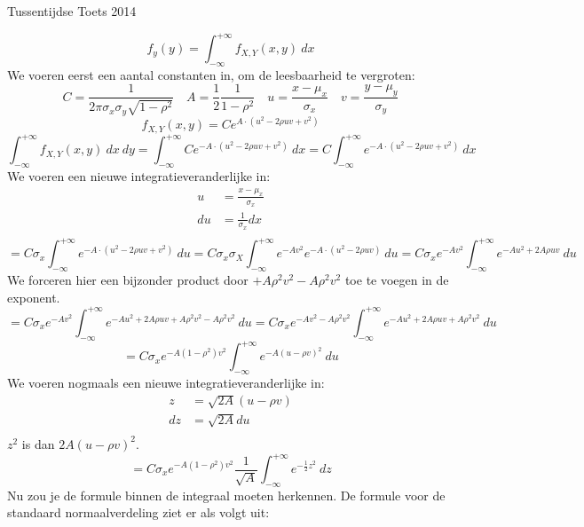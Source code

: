 \documentclass[main.tex]{subfiles}
\begin{document}
\begin{examenvraag}{Tussentijdse Toets 2014}
  \begin{ex-antwoord}
    \[ f_{y}(y) = \int_{-\infty}^{+\infty}f_{X,Y}(x,y)\ dx \]
    We voeren eerst een aantal constanten in, om de leesbaarheid te vergroten:
    \[ 
    C = \dfrac{1}{2\pi\sigma_{x}\sigma_{y}\sqrt{1-\rho^{2}}} \quad A = \frac{1}{2}\frac{1}{1-\rho^{2}} \quad u = \frac{x-\mu_{x}}{\sigma_{x}} \quad v = \frac{y-\mu_{y}}{\sigma_{y}}
    \]
    \[ f_{X,Y}(x,y) = C e^{A \cdot (u^{2}-2\rho u v + v^{2})} \]
    \[ \int_{-\infty}^{+\infty}f_{X,Y}(x,y)\ dx\ dy = \int_{-\infty}^{+\infty} C e^{-A \cdot (u^{2}-2\rho u v + v^{2})}\ dx = C\int_{-\infty}^{+\infty}e^{-A \cdot (u^{2}-2\rho u v + v^{2})}\ dx \]
    We voeren een nieuwe integratieveranderlijke in:
    \[ 
    \begin{array}{rl}
      u &= \frac{x-\mu_{x}}{\sigma_{x}}\\
      du &= \frac{1}{\sigma_{x}}dx\\
    \end{array}
    \]
    \[
    = C\sigma_{x}\int_{-\infty}^{+\infty}e^{-A \cdot (u^{2}-2\rho u v + v^{2})}\ du
    = C\sigma_{x}\sigma_{X}\int_{-\infty}^{+\infty}e^{-Av^{2}}e^{-A \cdot (u^{2}-2\rho u v)}\ du
    = C\sigma_{x}e^{-Av^{2}}\int_{-\infty}^{+\infty}e^{-Au^{2}+2A\rho u v}\ du
    \]
    We forceren hier een bijzonder product door $+ A\rho^{2}v^{2} - A\rho^{2}v^{2}$ toe te voegen in de exponent.
    \[
    = C\sigma_{x}e^{-Av^{2}}\int_{-\infty}^{+\infty}e^{-Au^{2}+2A\rho u v + A\rho^{2}v^{2} - A\rho^{2}v^{2}}\ du 
    = C\sigma_{x}e^{-Av^{2}-A\rho^{2}v^{2}}\int_{-\infty}^{+\infty}e^{-Au^{2}+2A\rho u v + A\rho^{2}v^{2}}\ du 
    \]
    \[
    = C\sigma_{x}e^{-A(1-\rho^{2})v^{2}}\int_{-\infty}^{+\infty}e^{-A(u-\rho v)^{2}}\ du 
    \]
    We voeren nogmaals een nieuwe integratieveranderlijke in:
    \[ 
    \begin{array}{rl}
      z &= \sqrt{2A}(u-\rho v) \\
      dz &= \sqrt{2A} du\\
    \end{array}
    \]
    $z^{2}$ is dan $2A(u-\rho v)^{2}$.
    \[
    = C\sigma_{x}e^{-A(1-\rho^{2})v^{2}}\frac{1}{\sqrt{A}}\int_{-\infty}^{+\infty}e^{-\frac{1}{2}z^{2}}\ dz
    \]
    Nu zou je de formule binnen de integraal moeten herkennen.
    De formule voor de standaard normaalverdeling ziet er als volgt uit:

\end{ex-antwoord}
\end{examenvraag}
\end{document}
